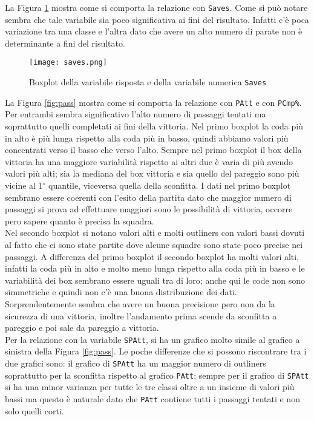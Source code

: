 La Figura \ref{fig:saves} mostra come si comporta la relazione con \texttt{Saves}. Come si può notare sembra che tale variabile sia poco significativa ai fini del risultato. Infatti c'è poca variazione tra una classe e l'altra dato che avere un alto numero di parate non è determinante a fini del risultato.\\

\begin{figure}[htbp]
	\begin{center}
		\texttt{[image: saves.png]}
		\caption{Boxplot della variabile risposta e della variabile numerica \texttt{Saves} } \label{fig:saves}
	\end{center}
\end{figure}

La Figura \ref{fig:pass} mostra come si comporta la relazione con \texttt{PAtt} e con \texttt{PCmp\%}. Per entrambi sembra significativo l'alto numero di passaggi tentati ma soprattutto quelli completati ai fini della vittoria. Nel primo boxplot la coda più in alto è più lunga rispetto alla coda più in basso, quindi abbiamo valori più concentrati verso il basso che verso l'alto. Sempre nel primo boxplot il box della vittoria ha una maggiore variabilità rispetto ai altri due è varia di più avendo valori più alti; sia la mediana del box vittoria e sia quello del pareggio sono più vicine al 1$^{\circ}$ quantile, viceversa quella della sconfitta. I dati nel primo boxplot sembrano essere coerenti con l'esito della partita dato che maggior numero di passaggi si prova ad effettuare maggiori sono le possibilità di vittoria, occorre pero sapere quanto è precisa la squadra.\\

Nel secondo boxplot si notano valori alti e molti outliners con valori bassi dovuti al fatto che ci sono state partite dove alcune squadre sono state poco precise nei passaggi. A differenza del primo boxplot il secondo boxplot ha molti valori alti, infatti la coda più in alto e molto meno lunga rispetto alla coda più in basso e le variabilità dei box sembrano essere uguali tra di loro; anche qui le code non sono simmetriche e quindi non c'è una buona distribuzione dei dati. Sorprendentemente sembra che avere un buona precisione pero non da la sicurezza di una vittoria, inoltre l'andamento prima scende da sconfitta a pareggio e poi sale da pareggio a vittoria.\\

Per la relazione con la variabile \texttt{SPAtt}, si ha un grafico molto simile al grafico a sinistra della Figura \ref{fig:pass}. Le poche differenze che si possono riscontrare tra i due grafici sono: il grafico di \texttt{SPAtt} ha un maggior numero di outliners soprattutto per la sconfitta rispetto al grafico \texttt{PAtt}; sempre per il grafico di \texttt{SPAtt} si ha una minor varianza per tutte le tre classi oltre a un insieme di valori più bassi ma questo è naturale dato che \texttt{PAtt} contiene tutti i passaggi tentati e non solo quelli corti.\\


